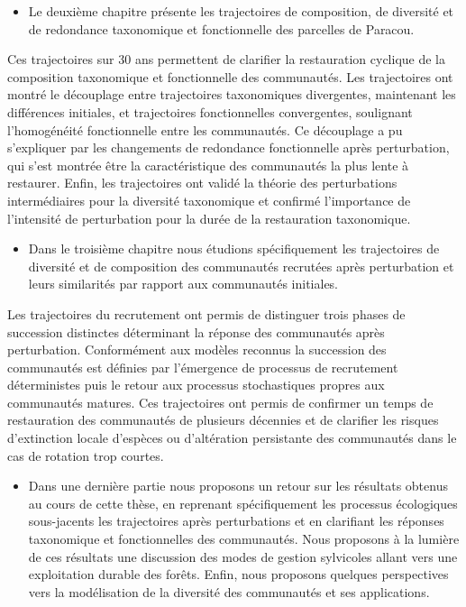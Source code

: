 \documentclass[
  11pt,
  french,
  A4paper,
  extrafontsizes,onecolumn,openright
  ]{memoir}
\providecommand{\tightlist}{%
  \setlength{\itemsep}{0pt}\setlength{\parskip}{0pt}}
\begin{document}
\begin{itemize}
\tightlist
\item
  Le deuxième chapitre présente les trajectoires de composition, de
  diversité et de redondance taxonomique et fonctionnelle des parcelles
  de Paracou.
\end{itemize}

Ces trajectoires sur 30 ans permettent de clarifier la restauration
cyclique de la composition taxonomique et fonctionnelle des communautés.
Les trajectoires ont montré le découplage entre trajectoires
taxonomiques divergentes, maintenant les différences initiales, et
trajectoires fonctionnelles convergentes, soulignant l'homogénéité
fonctionnelle entre les communautés. Ce découplage a pu s'expliquer par
les changements de redondance fonctionnelle après perturbation, qui
s'est montrée être la caractéristique des communautés la plus lente à
restaurer. Enfin, les trajectoires ont validé la théorie des
perturbations intermédiaires pour la diversité taxonomique et confirmé
l'importance de l'intensité de perturbation pour la durée de la
restauration taxonomique.

\begin{itemize}
\tightlist
\item
  Dans le troisième chapitre nous étudions spécifiquement les
  trajectoires de diversité et de composition des communautés recrutées
  après perturbation et leurs similarités par rapport aux communautés
  initiales.
\end{itemize}

Les trajectoires du recrutement ont permis de distinguer trois phases de
succession distinctes déterminant la réponse des communautés après
perturbation. Conformément aux modèles reconnus la succession des
communautés est définies par l'émergence de processus de recrutement
déterministes puis le retour aux processus stochastiques propres aux
communautés matures. Ces trajectoires ont permis de confirmer un temps
de restauration des communautés de plusieurs décennies et de clarifier
les risques d'extinction locale d'espèces ou d'altération persistante
des communautés dans le cas de rotation trop courtes.

\begin{itemize}
\tightlist
\item
  Dans une dernière partie nous proposons un retour sur les résultats
  obtenus au cours de cette thèse, en reprenant spécifiquement les
  processus écologiques sous-jacents les trajectoires après
  perturbations et en clarifiant les réponses taxonomique et
  fonctionnelles des communautés. Nous proposons à la lumière de ces
  résultats une discussion des modes de gestion sylvicoles allant vers
  une exploitation durable des forêts. Enfin, nous proposons quelques
  perspectives vers la modélisation de la diversité des communautés et
  ses applications.
\end{itemize}
\end{document}
